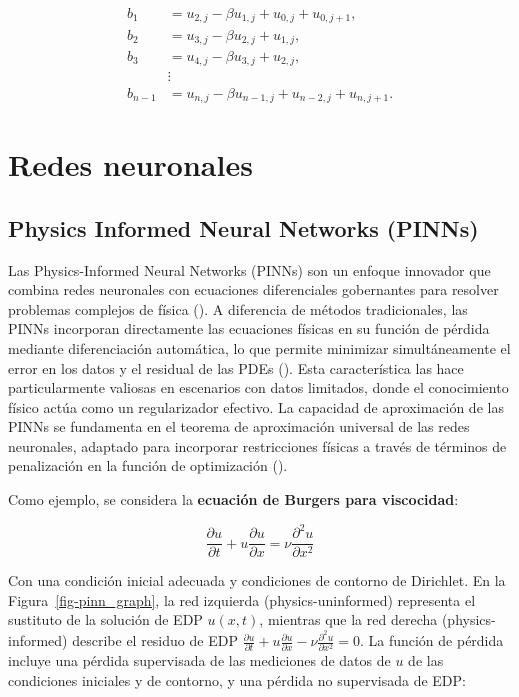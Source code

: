 \documentclass[
  spanish,
  us-letterpaper,
  DIV=11,
  numbers=noendperiod]{scrreprt}
\theoremstyle{plain}
\theoremstyle{definition}
\theoremstyle{remark}
\begin{document}
\begin{align*}
b_1 &= u_{2,j} - \beta u_{1,j} + u_{0,j} + u_{0,j+1}, \\
b_2 &= u_{3,j} - \beta u_{2,j} + u_{1,j}, \\
b_3 &= u_{4,j} - \beta u_{3,j} + u_{2,j}, \\
    &\vdots \\
b_{n-1} &= u_{n,j} - \beta u_{n-1,j} + u_{n-2,j} + u_{n,j+1}.
\end{align*}

\part{Redes neuronales}

\chapter{Physics Informed Neural Networks (PINNs)}\label{sec-pinns}

Las Physics-Informed Neural Networks (PINNs) son un enfoque innovador
que combina redes neuronales con ecuaciones diferenciales gobernantes
para resolver problemas complejos de física
(). A diferencia de
métodos tradicionales, las PINNs incorporan directamente las ecuaciones
físicas en su función de pérdida mediante diferenciación automática, lo
que permite minimizar simultáneamente el error en los datos y el
residual de las PDEs (). Esta característica las hace particularmente
valiosas en escenarios con datos limitados, donde el conocimiento físico
actúa como un regularizador efectivo. La capacidad de aproximación de
las PINNs se fundamenta en el teorema de aproximación universal de las
redes neuronales, adaptado para incorporar restricciones físicas a
través de términos de penalización en la función de optimización
().

Como ejemplo, se considera la \textbf{ecuación de Burgers para
viscocidad}:

\[
\frac{\partial u}{\partial t} + u \frac{\partial u}{\partial x} = \nu \frac{\partial^2 u}{\partial x^2}
\]

Con una condición inicial adecuada y condiciones de contorno de
Dirichlet. En la Figura~\ref{fig-pinn_graph}, la red izquierda
(physics-\hspace{0pt}uninformed) representa el sustituto de la solución
de EDP \(u(x, t)\), mientras que la red derecha
(physics-\hspace{0pt}informed) describe el residuo de EDP
\(\frac{\partial u}{\partial t} + u \frac{\partial u}{\partial x} - \nu \frac{\partial^2 u}{\partial x^2} = 0\).
La función de pérdida incluye una pérdida supervisada de las mediciones
de datos de \(u\) de las condiciones iniciales y de contorno, y una
pérdida no supervisada de EDP:
\end{document}
